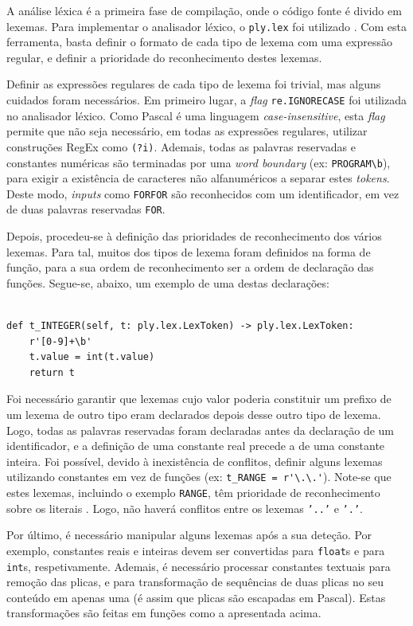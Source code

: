 \documentclass[12pt, a4paper]{article}
\begin{document}
A análise léxica é a primeira fase de compilação, onde o código fonte é divido em lexemas. Para
implementar o analisador léxico, o \texttt{ply.lex} foi utilizado \cite{ply}. Com esta ferramenta,
basta definir o formato de cada tipo de lexema com uma expressão regular, e definir a prioridade do
reconhecimento destes lexemas.

Definir as expressões regulares de cada tipo de lexema foi trivial, mas alguns cuidados foram
necessários. Em primeiro lugar, a \emph{flag} \texttt{re.IGNORECASE} foi utilizada no analisador
léxico. Como Pascal é uma linguagem \emph{case-insensitive}, esta \emph{flag} permite que não seja
necessário, em todas as expressões regulares, utilizar construções RegEx como \texttt{(?i)}.
Ademais, todas as palavras reservadas e constantes numéricas são terminadas por uma
\emph{word boundary} (ex: \verb|PROGRAM\b|), para exigir a existência de caracteres não
alfanuméricos a separar estes \emph{tokens}. Deste modo, \emph{inputs} como \texttt{FORFOR} são
reconhecidos com um identificador, em vez de duas palavras reservadas \texttt{FOR}.

Depois, procedeu-se à definição das prioridades de reconhecimento dos vários lexemas. Para tal,
muitos dos tipos de lexema foram definidos na forma de função, para a sua ordem de reconhecimento
ser a ordem de declaração das funções. Segue-se, abaixo, um exemplo de uma destas declarações:

\begin{lstlisting}

def t_INTEGER(self, t: ply.lex.LexToken) -> ply.lex.LexToken:
    r'[0-9]+\b'
    t.value = int(t.value)
    return t
\end{lstlisting}

Foi necessário garantir que lexemas cujo valor poderia constituir um prefixo de um lexema de outro
tipo eram declarados depois desse outro tipo de lexema. Logo, todas as palavras reservadas foram
declaradas antes da declaração de um identificador, e a definição de uma constante real precede a de
uma constante inteira. Foi possível, devido à inexistência de conflitos, definir alguns lexemas
utilizando constantes em vez de funções (ex: \verb|t_RANGE = r'\.\.'|). Note-se que estes lexemas,
incluindo o exemplo \texttt{RANGE}, têm prioridade de reconhecimento sobre os literais \cite{ply}.
Logo, não haverá conflitos entre os lexemas \texttt{'..'} e \texttt{'.'}.

Por último, é necessário manipular alguns lexemas após a sua deteção. Por exemplo, constantes reais
e inteiras devem ser convertidas para \texttt{float}s e para \texttt{int}s, respetivamente. Ademais,
é necessário processar constantes textuais para remoção das plicas, e para transformação de
sequências de duas plicas no seu conteúdo em apenas uma (é assim que plicas são escapadas em
Pascal). Estas transformações são feitas em funções como a apresentada acima.
\end{document}
